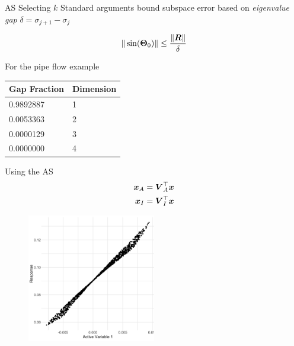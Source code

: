\documentclass[14pt]{beamer}
\begin{document}
\begin{frame}{AS Selecting $k$}
  Standard arguments bound subspace error based on \emph{eigenvalue gap} $\delta
  = \sigma_{j+1} - \sigma_j$

  \begin{equation*}
    \|\sin(\boldsymbol{\Theta}_0)\| \leq \frac{\|\boldsymbol{R}\|}{\delta}
  \end{equation*}

  For the pipe flow example
  \begin{table}
    \centering
    \begin{tabular}{@{}ll@{}}
      \hline
      Gap Fraction & Dimension\\
      \hline
      0.9892887 & 1\\
      \hline
      0.0053363 & 2\\
      \hline
      0.0000129 & 3\\
      \hline
      0.0000000 & 4\\
      \hline
    \end{tabular}
  \end{table}

\end{frame}

\begin{frame}{Using the AS}
  \begin{equation*} \begin{aligned}
      \boldsymbol{x}_A &= \boldsymbol{V}_A^{\top}\boldsymbol{x} \\
      \boldsymbol{x}_I &= \boldsymbol{V}_I^{\top}\boldsymbol{x}
  \end{aligned} \end{equation*}

  \begin{figure}
    \centering
    \includegraphics[width=0.5\textwidth]{../images/as_summary_nat}
  \end{figure}
\end{frame}
\end{document}
